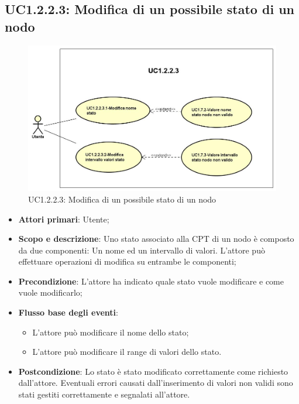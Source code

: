 \subsection{UC1.2.2.3: Modifica di un possibile stato di un nodo} 
\hypertarget{UC1.2.2.3}{} 
\begin{figure} [H]
	\centering
	\includegraphics[scale=0.45]{Img/UC1-2-2-3} 
	\caption{UC1.2.2.3: Modifica di un possibile stato di un nodo} \label{} 
\end{figure} 
\begin{itemize} 
	\item{\textbf{Attori primari}: Utente;} 
	\item{\textbf{Scopo e descrizione}: Uno stato associato alla CPT di un nodo è composto da due componenti: Un nome ed un intervallo di valori. L'attore può effettuare operazioni di modifica su entrambe le componenti;} 
	\item{\textbf{Precondizione}: L'attore ha indicato quale stato vuole modificare e come vuole modificarlo;} 
	\item{\textbf{Flusso base degli eventi}: 
		\begin{itemize} 
			\item{L'attore può modificare il nome dello stato;} 
			\item{L'attore può modificare il range di valori dello stato.} 
		\end{itemize} 			
	} 
	\item{\textbf{Postcondizione}: Lo stato è stato modificato correttamente come richiesto dall'attore. Eventuali errori causati dall'inserimento di valori non validi sono stati gestiti correttamente e segnalati all'attore.} 
\end{itemize} 
